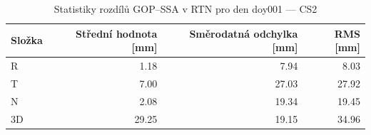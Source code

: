 \begin{table}[H]
\centering
\caption{Statistiky rozdílů GOP–SSA v RTN pro den doy001 — CS2}
\label{tab:cr_ZAZG_doy001_day_stats}
\begin{tabular}{lrrr}
\toprule
Složka & Střední hodnota [mm] & Směrodatná odchylka [mm] & RMS [mm] \\
\midrule
R & 1.18 & 7.94 & 8.03 \\
T & 7.00 & 27.03 & 27.92 \\
N & 2.08 & 19.34 & 19.45 \\
3D & 29.25 & 19.15 & 34.96 \\
\bottomrule
\end{tabular}
\end{table}
